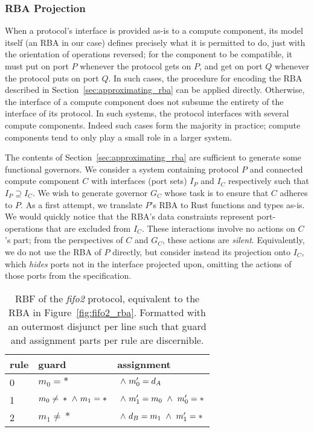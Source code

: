 \subsubsection{RBA Projection}
\label{sec:rba_projection}
When a protocol's interface is provided as-is to a compute component, its model itself (an RBA in our case) defines precisely what it is permitted to do, just with the orientation of operations reversed; for the component to be compatible, it must put on port $P$ whenever the protocol gets on $P$, and get on port $Q$ whenever the protocol puts on port $Q$. In such cases, the procedure for encoding the RBA described in Section~\ref{sec:approximating_rba} can be applied directly. Otherwise, the interface of a compute component does not subsume the entirety of the interface of its protocol. In such systems, the protocol interfaces with several compute components. Indeed such cases form the majority in practice; compute components tend to only play a small role in a larger system.

The contents of Section~\ref{sec:approximating_rba} are sufficient to generate some functional governors. We consider a system containing protocol $P$ and connected compute component $C$ with interfaces (port sets) $I_P$ and $I_C$ respectively such that $I_P \supseteq{} I_C$. We wish to generate governor $G_C$ whose task is to ensure that $C$ adheres to $P$. As a first attempt, we translate $P$'s RBA to Rust functions and types as-is. We would quickly notice that the RBA's data constraints represent port-operations that are excluded from $I_C$. These interactions involve no actions on $C$'s part; from the perspectives of $C$ and $G_C$, these actions are \textit{silent}. Equivalently, we do not use the RBA of $P$ directly, but consider instead its projection onto $I_C$, which \textit{hides} ports not in the interface projected upon, omitting the actions of those ports from the specification. 


\begin{table}
	\centering
	\begin{tabular}{l|ll|}
		rule & guard & assignment \\
		\hline
		0 & $m_0=*$ & $\ \wedge{}\ {}m_0'=d_A$\\
		1 & $m_0\neq{}*\ \wedge{}\ {}m_1=*$ & $\ \wedge{}\ {}m_1'=m_0\ \wedge{}\ {}m_0'=*$ \\
		2 & $m_1\neq{}*$ & $\ \wedge{}\ {}d_B=m_1\ \wedge{}\ {}m_1'=*$ \\
		\hline
	\end{tabular}
	\caption[RBF for the fifo2 connector.]{RBF of the \textit{fifo2} protocol, equivalent to the RBA in Figure~\ref{fig:fifo2_rba}. Formatted with an outermost disjunct per line such that guard and assignment parts per rule are discernible.}
	\label{tab:fifo2_rbf_tsa}
\end{table}

